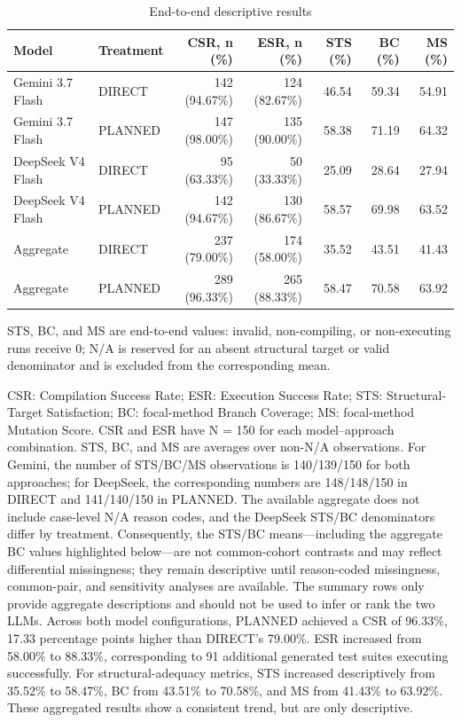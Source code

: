 \documentclass[pdflatex,sn-basic,Numbered,iicol]{sn-jnl}
\begin{document}
\begin{table}[htbp]
\caption{End-to-end descriptive results}\label{tab:rq1-descriptive}
\centering
\scriptsize
\begin{tabularx}{\textwidth}{@{}>{\raggedright\arraybackslash}X l r r r r r@{}}
\toprule
Model & Treatment & CSR, n (\%) & ESR, n (\%) & STS (\%) & BC (\%) & MS (\%) \\
\midrule
Gemini 3.7 Flash & DIRECT & 142 (94.67\%) & 124 (82.67\%) & 46.54 & 59.34 & 54.91 \\
Gemini 3.7 Flash & PLANNED & 147 (98.00\%) & 135 (90.00\%) & 58.38 & 71.19 & 64.32 \\
DeepSeek V4 Flash & DIRECT & 95 (63.33\%) & 50 (33.33\%) & 25.09 & 28.64 & 27.94 \\
DeepSeek V4 Flash & PLANNED & 142 (94.67\%) & 130 (86.67\%) & 58.57 & 69.98 & 63.52 \\
Aggregate & DIRECT & 237 (79.00\%) & 174 (58.00\%) & 35.52 & 43.51 & 41.43 \\
Aggregate & PLANNED & 289 (96.33\%) & 265 (88.33\%) & 58.47 & 70.58 & 63.92 \\
\bottomrule
\end{tabularx}
\begin{tablenotes}
\item STS, BC, and MS are end-to-end values: invalid, non-compiling, or non-executing runs receive 0; N/A is reserved for an absent structural target or valid denominator and is excluded from the corresponding mean.
\end{tablenotes}
\end{table}

CSR: Compilation Success Rate; ESR: Execution Success Rate; STS: Structural-Target Satisfaction; BC: focal-method Branch Coverage; MS: focal-method Mutation Score. CSR and ESR have N = 150 for each model--approach combination. STS, BC, and MS are averages over non-N/A observations. For Gemini, the number of STS/BC/MS observations is 140/139/150 for both approaches; for DeepSeek, the corresponding numbers are 148/148/150 in DIRECT and 141/140/150 in PLANNED. The available aggregate does not include case-level N/A reason codes, and the DeepSeek STS/BC denominators differ by treatment. Consequently, the STS/BC means---including the aggregate BC values highlighted below---are not common-cohort contrasts and may reflect differential missingness; they remain descriptive until reason-coded missingness, common-pair, and sensitivity analyses are available. The summary rows only provide aggregate descriptions and should not be used to infer or rank the two LLMs. Across both model configurations, PLANNED achieved a CSR of 96.33\%, 17.33 percentage points higher than DIRECT's 79.00\%. ESR increased from 58.00\% to 88.33\%, corresponding to 91 additional generated test suites executing successfully. For structural-adequacy metrics, STS increased descriptively from 35.52\% to 58.47\%, BC from 43.51\% to 70.58\%, and MS from 41.43\% to 63.92\%. These aggregated results show a consistent trend, but are only descriptive.
\end{document}

